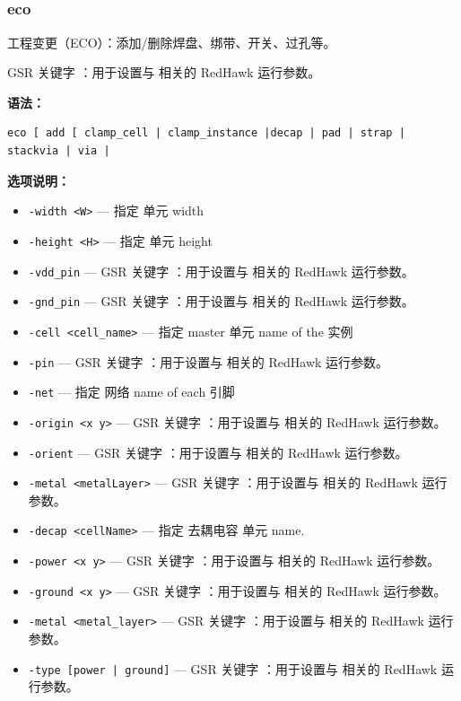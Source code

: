 \subsection{}
\subsubsection*{eco}

工程变更（ECO）：添加/删除焊盘、绑带、开关、过孔等。

GSR 关键字 ：用于设置与  相关的 RedHawk 运行参数。

\textbf{语法：}
\begin{lstlisting}
eco [ add [ clamp_cell | clamp_instance |decap | pad | strap | stackvia | via |
\end{lstlisting}

\textbf{选项说明：}
\begin{itemize}
\item \texttt{-width <W>} — 指定 单元 width
\item \texttt{-height <H>} — 指定 单元 height
\item \texttt{-vdd\_pin} — GSR 关键字 ：用于设置与  相关的 RedHawk 运行参数。
\item \texttt{-gnd\_pin} — GSR 关键字 ：用于设置与  相关的 RedHawk 运行参数。
\item \texttt{-cell <cell\_name>} — 指定 master 单元 name of the 实例
\item \texttt{-pin} — GSR 关键字 ：用于设置与  相关的 RedHawk 运行参数。
\item \texttt{-net} — 指定 网络 name of each 引脚
\item \texttt{-origin <x y>} — GSR 关键字 ：用于设置与  相关的 RedHawk 运行参数。
\item \texttt{-orient} — GSR 关键字 ：用于设置与  相关的 RedHawk 运行参数。
\item \texttt{-metal <metalLayer>} — GSR 关键字 ：用于设置与  相关的 RedHawk 运行参数。
\item \texttt{-decap <cellName>} — 指定 去耦电容 单元 name.
\item \texttt{-power <x y>} — GSR 关键字 ：用于设置与  相关的 RedHawk 运行参数。
\item \texttt{-ground <x y>} — GSR 关键字 ：用于设置与  相关的 RedHawk 运行参数。
\item \texttt{-metal <metal\_layer>} — GSR 关键字 ：用于设置与  相关的 RedHawk 运行参数。
\item \texttt{-type [power | ground]} — GSR 关键字 ：用于设置与  相关的 RedHawk 运行参数。

\end{itemize}
